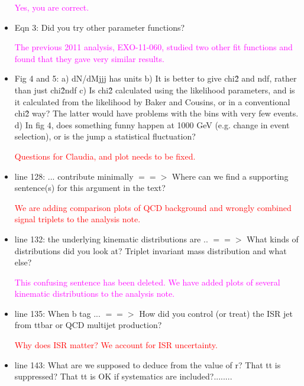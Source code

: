 \documentclass[paper=a4, fontsize=11pt]{scrartcl}
\begin{document}
\begin{itemize}
\textcolor{magenta}{Yes, you are correct.}\\

\item Eqn 3: Did you try other parameter functions?

\textcolor{magenta}{The previous 2011 analysis, EXO-11-060, studied two other
fit functions and found that they gave very similar results.}\\

\item Fig 4 and 5: a) dN/dMjjj has units b) It is better to give chi\^2 and ndf, rather than just chi\^2\/ndf c) Is chi\^2 calculated using the likelihood parameters, and is it calculated from the likelihood by Baker and Cousins, or in a conventional chi\^2 way? The latter would have problems with the bins with very few events. d) In fig 4, does something funny happen at 1000 GeV (e.g. change in event selection), or is the jump a statistical fluctuation?

\textcolor{red}{Questions for Claudia, and plot needs to be fixed.}\\

\item line 128: ... contribute minimally $==>$ Where can we find a supporting sentence(s) for this argument in the text?

\textcolor{red}{We are adding comparison plots of QCD background and 
wrongly combined signal triplets to the analysis note.}\\

\item line 132: the underlying kinematic distributions are .. $==>$ What kinds of distributions did you look at? Triplet invariant mass distribution and what else?

\textcolor{magenta}{This confusing sentence has been deleted. We have added
plots of several kinematic distributions to the analysis note.}\\

\item line 135: When b tag ... $==>$ How did you control (or treat) the ISR jet from ttbar or QCD multijet production?

\textcolor{red}{Why does ISR matter? We account for ISR uncertainty.}\\


\item line 143: What are we supposed to deduce from the value of r? That tt is suppressed? That tt is OK if systematics are included?........


\end{itemize}
\end{document}
